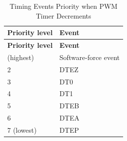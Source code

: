 \begin{longtable}[c]{|p{6cm}|p{6cm}|}
    \caption{Timing Events Priority when PWM Timer Decrements}
    \label{tab:mcpwm-evt-prio-d}
    \\\hline
    \rowcolor{lightgray}
    \textbf{Priority level}
    & \textbf{Event}
    \\\hline
    \endfirsthead
    \hline
    \rowcolor{lightgray}   
    \textbf{Priority level}
    & \textbf{Event}
    \\\hline
    \endhead
    \hline
    \endfoot
    1 (highest)
    & Software-force event
    \\\hline
    2
    & DTEZ
    \\\hline
    3
    & DT0
    \\\hline
    4
    & DT1
    \\\hline
    5
    & DTEB
    \\\hline
    6
    & DTEA
    \\\hline
    7 (lowest)
    & DTEP
    \end{longtable}